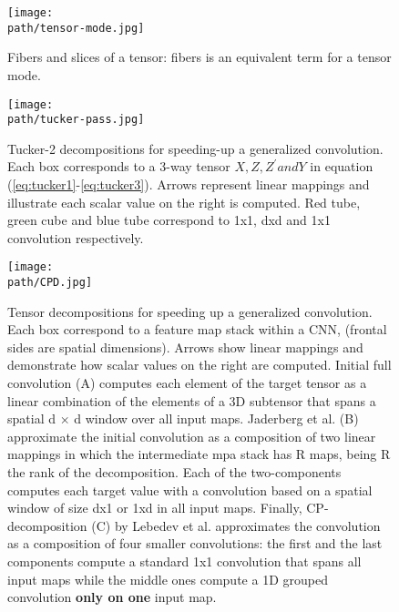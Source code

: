 \begin{figure}[h!]
 \centering
 \texttt{[image: \\path/tensor-mode.jpg]} 
 \caption{Fibers and slices of a tensor: fibers is an equivalent term for a tensor mode.}
 \label{fig:tensor-fibers}
\end{figure}

\begin{figure}[h!]
 \centering
 \texttt{[image: \\path/tucker-pass.jpg]} 
 \caption{Tucker-2  decompositions  for  speeding-up  a generalized convolution. Each box corresponds to a 3-way tensor $X, Z, Z^' and Y$ in equation (\ref{eq:tucker1}-\ref{eq:tucker3}). Arrows represent linear mappings 
and illustrate each scalar value on the right is computed. Red tube, green cube and blue tube correspond to 
1x1, dxd and 1x1 convolution respectively.}
 \label{fig:tucker-pass}
\end{figure}


\begin{figure}[h!]
 \centering
 \texttt{[image: \\path/CPD.jpg]} 
 \caption{Tensor decompositions for speeding up a generalized convolution. Each box correspond to a feature map stack within a CNN, (frontal sides are spatial dimensions). Arrows show linear mappings and demonstrate how scalar values on the right are computed. Initial full convolution (A) computes each element of the target tensor as a linear combination of the elements of a 3D subtensor that spans a spatial d × d window over all input maps. 
Jaderberg et al. (B) approximate the initial convolution as a composition of two linear mappings in which the intermediate mpa stack has R  maps, being R the rank of the decomposition. Each of the two-components 
computes each target value with a convolution based on a spatial window of size dx1 or 1xd in all input maps. Finally, CP-decomposition (C) by Lebedev et al. approximates the convolution as a composition of four smaller convolutions: the first and the last components compute a standard 1x1 convolution that spans all input maps while the middle ones compute a 1D grouped convolution \textbf{only on one} input map.}
 \label{fig:cpd-pass}
\end{figure}

